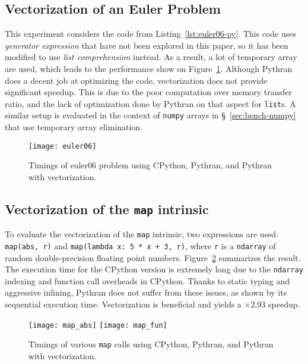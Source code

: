 \documentclass[preprint]{sigplanconf}
\begin{document}
\subsection{Vectorization of an Euler Problem}

This experiment considers the code from Listing~\ref{lst:euler06-py}. This code
uses \emph{generator expression} that have not been explored in this paper, so
it has been modified to use \emph{list comprehension} instead. As a result, a
lot of temporary array are used, which leads to the performance show on
Figure~\ref{fig:euler06-timings}. Although Pythran does a decent job at
optimizing the code, vectorization does not provide significant speedup. This
is due to the poor computation over memory transfer ratio, and the lack of
optimization done by Pythran on that aspect for \texttt{list}s. A similar setup
is evaluated in the context of \texttt{numpy} arrays in
\S~\ref{sec:bench-numpy} that use temporary array elimination.

\begin{figure}[ht]

    \texttt{[image: euler06]}
    \caption{Timings of euler06 problem using CPython, Pythran, and Pythran with vectorization.}
    \label{fig:euler06-timings}

\end{figure}

\subsection{Vectorization of the \texttt{map} intrinsic}

To evaluate the vectorization of the \texttt{map} intrinsic, two expressions
are used: \texttt{map(abs, r)} and \texttt{map(lambda x: 5 * x + 3, r)}, where
\texttt{r} is a \texttt{ndarray} of random double-precision floating point
numbers. Figure~\ref{fig:map-timings} summarizes the result. The execution time
for the CPython version is extremely long due to the \texttt{ndarray} indexing and
function call overheads in CPython. Thanks to static typing and aggressive
inlining, Pythran does not suffer from these issues, as shown by its sequential
execution time. Vectorization is beneficial and yields a $\times2.93$ speedup.

\begin{figure}[ht]

    \texttt{[image: map\_abs]}
    \texttt{[image: map\_fun]}
    \caption{Timings of various \texttt{map} calls using CPython, Pythran, and Pythran with vectorization.}
    \label{fig:map-timings}

\end{figure}
\end{document}

